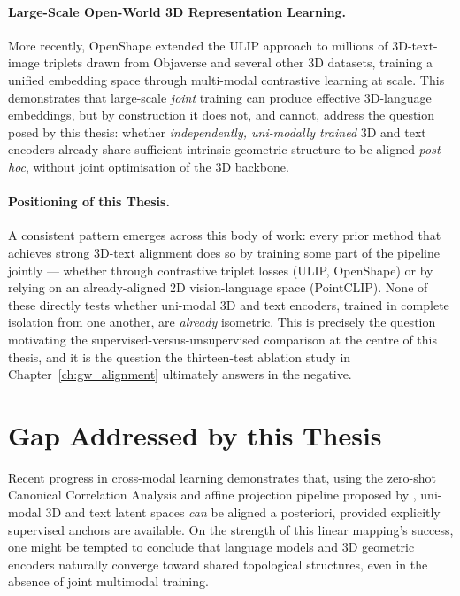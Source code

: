 \paragraph{Large-Scale Open-World 3D Representation Learning.}
More recently, OpenShape \cite{liu2023openshape} extended the ULIP approach to millions of 3D-text-image triplets drawn from Objaverse and several other 3D datasets, training a unified embedding space through multi-modal contrastive learning at scale. This demonstrates that large-scale \emph{joint} training can produce effective 3D-language embeddings, but by construction it does not, and cannot, address the question posed by this thesis: whether \emph{independently, uni-modally trained} 3D and text encoders already share sufficient intrinsic geometric structure to be aligned \emph{post hoc}, without joint optimisation of the 3D backbone.

\paragraph{Positioning of this Thesis.}
A consistent pattern emerges across this body of work: every prior method that achieves strong 3D-text alignment does so by training some part of the pipeline jointly --- whether through contrastive triplet losses (ULIP, OpenShape) or by relying on an already-aligned 2D vision-language space (PointCLIP). None of these directly tests whether uni-modal 3D and text encoders, trained in complete isolation from one another, are \emph{already} isometric. This is precisely the question motivating the supervised-versus-unsupervised comparison at the centre of this thesis, and it is the question the thirteen-test ablation study in Chapter~\ref{ch:gw_alignment} ultimately answers in the negative.

\section{Gap Addressed by this Thesis}
\label{sec:gap_addressed}

Recent progress in cross-modal learning demonstrates that, using the zero-shot Canonical Correlation Analysis and affine projection pipeline proposed by \textcite{hadgi2025escaping}, uni-modal 3D and text latent spaces \emph{can} be aligned a posteriori, provided explicitly supervised anchors are available. On the strength of this linear mapping's success, one might be tempted to conclude that language models and 3D geometric encoders naturally converge toward shared topological structures, even in the absence of joint multimodal training.

